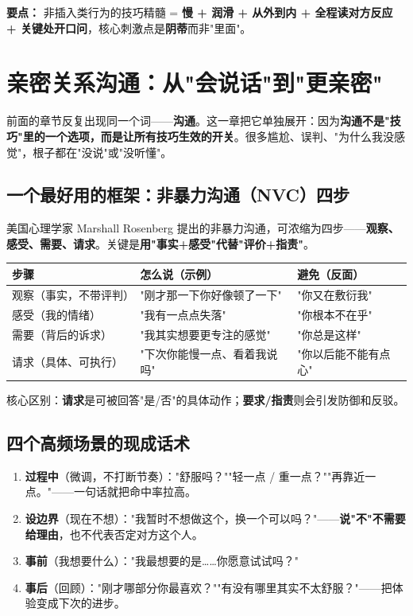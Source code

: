\documentclass[12pt,UTF8,openany]{ctexbook}
\begin{document}
\vspace{1em}
\noindent\textbf{要点：} 非插入类行为的技巧精髓 = \textbf{慢 + 润滑 + 从外到内 + 全程读对方反应 + 关键处开口问}，核心刺激点是\textbf{阴蒂}而非"里面"。

\chapter{亲密关系沟通：从"会说话"到"更亲密"}
\label{chap:communication}

前面的章节反复出现同一个词——\textbf{沟通}。这一章把它单独展开：因为\textbf{沟通不是"技巧"里的一个选项，而是让所有技巧生效的开关}。很多尴尬、误判、"为什么我没感觉"，根子都在"没说"或"没听懂"。

\section{一个最好用的框架：非暴力沟通（NVC）四步}

美国心理学家 Marshall Rosenberg 提出的非暴力沟通，可浓缩为四步——\textbf{观察、感受、需要、请求}。关键是\textbf{用"事实+感受"代替"评价+指责"}。

\begin{tabularx}{\textwidth}{p{2.6cm}XX}
\toprule
步骤 & 怎么说（示例） & 避免（反面） \\
\midrule
观察（事实，不带评判） & "刚才那一下你好像顿了一下" & "你又在敷衍我" \\
感受（我的情绪） & "我有一点点失落" & "你根本不在乎" \\
需要（背后的诉求） & "我其实想要更专注的感觉" & "你总是这样" \\
请求（具体、可执行） & "下次你能慢一点、看着我说吗" & "你以后能不能有点心" \\
\bottomrule
\end{tabularx}

\vspace{0.5em}
\noindent 核心区别：\textbf{请求}是可被回答"是/否"的具体动作；\textbf{要求/指责}则会引发防御和反驳。

\section{四个高频场景的现成话术}

\begin{enumerate}[leftmargin=2em,itemsep=0.3em]
  \item \textbf{过程中}（微调，不打断节奏）："舒服吗？""轻一点 / 重一点？""再靠近一点。"——一句话就把命中率拉高。
  \item \textbf{设边界}（现在不想）："我暂时不想做这个，换一个可以吗？"——\textbf{说"不"不需要给理由}，也不代表否定对方这个人。
  \item \textbf{事前}（我想要什么）："我最想要的是……你愿意试试吗？"
  \item \textbf{事后}（回顾）："刚才哪部分你最喜欢？""有没有哪里其实不太舒服？"——把体验变成下次的进步。
\end{enumerate}
\end{document}
